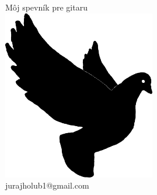 \documentclass[12pt]{article}
\begin{document}
	
\newenvironment{song}[2]
{
\begin{minipage}{\textwidth}
\subsection{#1}
\begin{multicols}{#2}
\begin{guitar}\begin{Center}
}
{
\end{Center}\end{guitar}
\end{multicols}\end{minipage}
}
	
\newenvironment{songgroup}[1]
{
\begin{minipage}{\textwidth}
\begin{multicols}{#1}
}
{
\end{multicols}\end{minipage}
}
	
\newenvironment{groupitem}[1]
{
\subsection{#1}
\begin{guitar}\begin{center}
}
{
\end{center}\end{guitar}
}
	
\begin{titlepage}
	\begin{center}
		{\Huge Môj spevník pre gitaru}
		\\
		\medskip \medskip \medskip 
		\includegraphics[width=0.5\textwidth]{pigeon.pdf}
		\\ 
		jurajholub1@gmail.com
	\end{center}
\end{titlepage}
\end{document}
